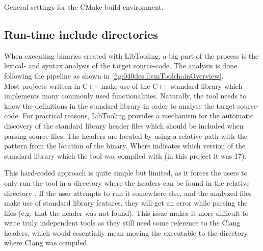\begin{listing}[H]
    \caption{General settings for the CMake build environment.}
    \label{code:080dev:cmake_base_settings}
\end{listing}

\subsection{Run-time include directories}\label{subsec:080dev:rt_include}
When executing binaries created with LibTooling, a big part of the process is the lexical- and syntax analysis of the target source-code. The analysis is done following the pipeline as shown in \cref{fig:040des:llvmToolchainOverview}.
\\Most projects written in C++ make use of the C++ standard library which implements many commonly used functionalities. Naturally, the tool needs to know the definitions in the standard library in order to analyse the target source-code. 
For practical reasons, LibTooling provides a mechanism for the automatic discovery of the standard library header files which should be included when parsing source files. The headers are located by using a relative path with the pattern  from the location of the binary. Where  indicates which version of the standard library which the tool was compiled with (in this project it was 17).

This hard-coded approach is quite simple but limited, as it forces the users to only run the tool in a directory where the headers can be found in the relative directory .
If the user attempts to run it somewhere else, and the analyzed files make use of standard library features, they will get an error while parsing the files (e.g. that the header  was not found).
This issue makes it more difficult to write truly independent tools as they still need some reference to the Clang headers, which would essentially mean moving the executable to the directory where Clang was compiled.

